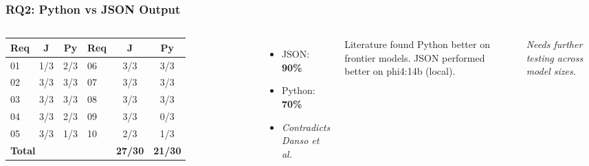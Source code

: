 
\begin{frame}
  \frametitle{RQ2: Python vs JSON Output}

  \begin{columns}
  \centering
  \footnotesize
  \renewcommand{\arraystretch}{1.3}
  \begin{tabular}{lcc|lcc}
  \toprule
  \textbf{Req} & \textbf{J} & \textbf{Py} & \textbf{Req} & \textbf{J} & \textbf{Py} \\
  \midrule
  01 & 1/3 & 2/3 & 06 & 3/3 & 3/3 \\
  02 & 3/3 & 3/3 & 07 & 3/3 & 3/3 \\
  03 & 3/3 & 3/3 & 08 & 3/3 & 3/3 \\
  04 & 3/3 & 2/3 & 09 & 3/3 & 0/3 \\
  05 & 3/3 & 1/3 & 10 & 2/3 & 1/3 \\
  \midrule
  \multicolumn{4}{l}{\textbf{Total}} & \textbf{27/30} & \textbf{21/30} \\
  \bottomrule
  \end{tabular}

  \begin{itemize}
    \item JSON: \textbf{90\%}
    \item Python: \textbf{70\%}
    \item \textit{Contradicts Danso et al.}
  \end{itemize}

  \bigskip
  \small
  Literature found Python better on frontier models.
  JSON performed better on phi4:14b (local).

  \bigskip
  \textit{Needs further testing across model sizes.}
  \end{columns}
\end{frame}



